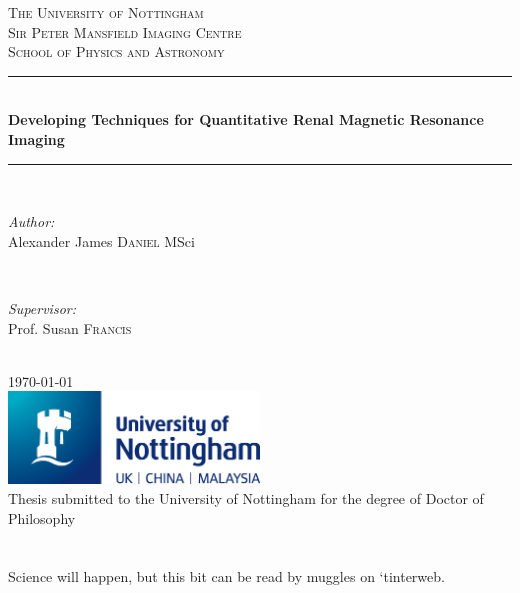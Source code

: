 \documentclass[11pt,a4paper,oneside]{report}
\author{Alexander James Daniel}
\makeatletter
\newcommand\blankpage{
    \null
    \thispagestyle{empty}
    \addtocounter{page}{-1}
    \newpage}
\renewenvironment{abstract}{
	\if@twocolumn
	\section*{\abstractname}
	\else
	\small
	\begin{center}
		{\bfseries \abstractname\vspace{-.5em}\vspace{\z@}}%
	\end{center}
	\quotation
	\fi}
{\if@twocolumn\else\endquotation\fi}
\makeatother
\begin{document}
{
\begin{titlepage}

\newcommand{\HRule}{\rule{\linewidth}{0.5mm}}
\center
 
\textsc{\LARGE The University of Nottingham}\\[0.5cm]
\textsc{\Large Sir Peter Mansfield Imaging Centre}\\[0.5cm]
\textsc{\large School of Physics and Astronomy}\\[0.5cm]

\HRule \\[0.4cm]
{ \Large \bfseries Developing Techniques for Quantitative Renal Magnetic Resonance Imaging}\\[0.2cm]
\HRule \\[1.5cm]

\begin{minipage}{0.4\textwidth}
\begin{flushleft} \large
\emph{Author:}\\
Alexander James \textsc{Daniel} MSci
\end{flushleft}
\end{minipage}
~
\begin{minipage}{0.4\textwidth}
\begin{flushright} \large
\emph{Supervisor:} \\
Prof. Susan \textsc{Francis}
\end{flushright}
\end{minipage}\\[4cm]
{\large \today}\\[2cm]

\includegraphics[width=0.5\textwidth]{UoN_Primary_Logo_CMYK.eps}\\[1cm]
Thesis submitted to the University of Nottingham for the degree of Doctor of Philosophy
\vfill
\afterpage{\blankpage}
\end{titlepage}
}
\pagestyle{plain}

\begin{abstract}
	Science will happen, but this bit can be read by muggles on `tinterweb.
\end{abstract}
\setcounter{tocdepth}{2}
\tableofcontents
\newpage
\end{document}
